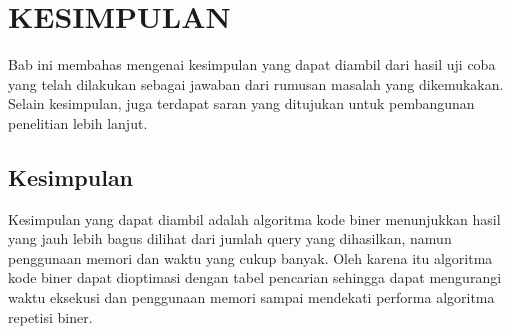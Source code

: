 \chapter{KESIMPULAN}

Bab ini membahas mengenai kesimpulan yang dapat diambil dari hasil uji coba yang telah dilakukan sebagai jawaban dari rumusan masalah yang dikemukakan. Selain kesimpulan, juga terdapat saran yang ditujukan untuk pembangunan penelitian lebih lanjut.

\section{Kesimpulan}

Kesimpulan yang dapat diambil adalah algoritma kode biner menunjukkan hasil yang jauh lebih bagus dilihat dari jumlah query yang dihasilkan, namun penggunaan memori dan waktu yang cukup banyak. Oleh karena itu algoritma kode biner dapat dioptimasi dengan tabel pencarian sehingga dapat mengurangi waktu eksekusi dan penggunaan memori sampai mendekati performa algoritma repetisi biner.